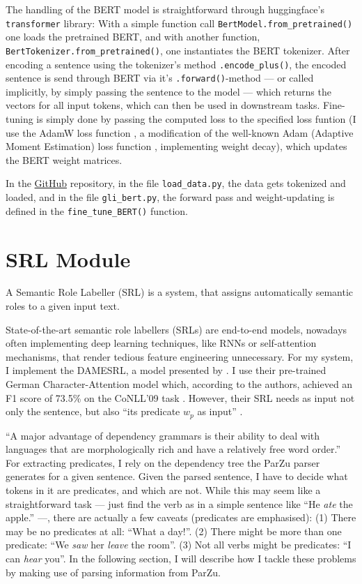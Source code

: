 The handling of the BERT model is straightforward through huggingface's \texttt{transformer}
library: With a simple function call \texttt{BertModel.from\_pretrained()} one loads the
pretrained BERT, and with another function, \texttt{BertTokenizer.from\_pretrained()},
one instantiates the BERT tokenizer.
After encoding a sentence using the tokenizer's method \texttt{.encode\_plus()}, the
encoded sentence is send through BERT via it's \texttt{.forward()}-method --- or
called implicitly, by simply passing the sentence to the model --- which returns the
vectors for all input tokens, which can then be used in downstream tasks. Fine-tuning
is simply done by passing the computed loss to the specified loss funtion (I use the
AdamW loss function \citep{loshchilov2019decoupled}, a modification of the well-known
Adam (Adaptive Moment Estimation) loss function \citep{kingma2014adam}, implementing
weight decay), which updates the BERT weight matrices.

In the \href{https://github.com/JonathanSchaber/Masterarbeit}{GitHub} repository, in
the file \texttt{load\_data.py}, the data gets tokenized and loaded, and in
the file \texttt{gli\_bert.py}, the forward pass and weight-updating is
defined in the \texttt{fine\_tune\_BERT()} function.


\section{SRL Module}

A Semantic Role Labeller (SRL) is a system, that assigns automatically semantic roles to a
given input text.

State-of-the-art semantic role labellers (SRLs) are end-to-end models, nowadays often
implementing deep learning techniques, like RNNs or self-attention mechanisms, that render
tedious feature engineering unnecessary.  For my system, I implement the DAMESRL, a model
presented by \cite{do2018flexible}.  I use their pre-trained German Character-Attention
model which, according to the authors, achieved an F1 score of 73.5\% on the CoNLL'09 task
\citep{hajivc2009conll}.  However, their SRL needs as input not only the sentence, but also
``its predicate $w_p$ as input'' \citep{do2018flexible}.

``A major advantage of dependency grammars is their ability to deal with languages that are
morphologically rich and have a relatively free word order.'' \citep[p.~274]{jurafsky2019speech}
For extracting predicates, I rely on the dependency tree the ParZu parser
\cite{sennrich2013exploiting} generates for a given sentence.  Given the parsed sentence, I
have to decide what tokens in it are predicates, and which are not.  While this may seem like
a straightforward task --- just find the verb as in a simple sentence like ``He \emph{ate}
the apple.'' ---, there are actually a few caveats (predicates are emphasised): (1) There
may be no predicates at all: ``What a day!''. (2) There might be more than one predicate:
``We \emph{saw} her \emph{leave} the room''. (3) Not all verbs might be predicates: ``I can
\emph{hear} you''.  In the following section, I will describe how I tackle these problems by
making use of parsing information from ParZu.


